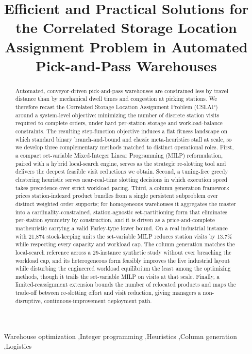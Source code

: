 \documentclass[preprint,review,11pt,authoryear]{elsarticle}
\begin{document}
\begin{frontmatter}

\title{Efficient and Practical Solutions for the Correlated Storage Location Assignment Problem in Automated Pick-and-Pass Warehouses}


\begin{abstract}
Automated, conveyor-driven pick-and-pass warehouses are constrained less by travel distance than by mechanical dwell times and congestion at picking stations. We therefore recast the Correlated Storage Location Assignment Problem (CSLAP) around a system-level objective: minimizing the number of discrete station visits required to complete orders, under hard per-station storage and workload-balance constraints. The resulting step-function objective induces a flat fitness landscape on which standard binary branch-and-bound and classic meta-heuristics stall at scale, so we develop three complementary methods matched to distinct operational roles. First, a compact set-variable Mixed-Integer Linear Programming (MILP) reformulation, paired with a hybrid local-search engine, serves as the strategic re-slotting tool and delivers the deepest feasible visit reductions we obtain. Second, a tuning-free greedy clustering heuristic serves near-real-time slotting decisions in which execution speed takes precedence over strict workload pacing. Third, a column generation framework prices station-indexed product bundles from a single persistent subproblem over distinct weighted order supports; for homogeneous warehouses it aggregates the master into a cardinality-constrained, station-agnostic set-partitioning form that eliminates per-station symmetry by construction, and it is driven as a price-and-complete matheuristic carrying a valid Farley-type lower bound. On a real industrial instance with 21,874 stock-keeping units the set-variable MILP reduces station visits by 13.7\% while respecting every capacity and workload cap. The column generation matches the local-search reference across a 29-instance synthetic study without ever breaching the workload cap, and its heterogeneous form feasibly improves the live industrial layout while disturbing the engineered workload equilibrium the least among the optimizing methods, though it trails the set-variable MILP on visits at that scale. Finally, a limited-reassignment extension bounds the number of relocated products and maps the trade-off between re-slotting effort and visit reduction, giving managers a non-disruptive, continuous-improvement deployment path.
\end{abstract}

\begin{keyword}
Warehouse optimization \sep Integer programming \sep Heuristics \sep Column generation \sep Logistics
\end{keyword}

\end{frontmatter}
\clearpage
\end{document}

